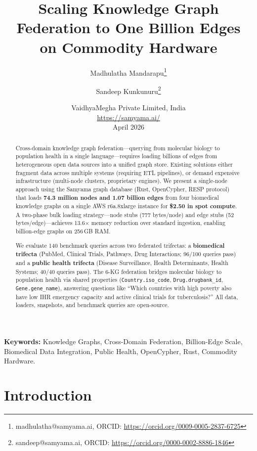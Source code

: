\documentclass[11pt]{article}
\title{Scaling Knowledge Graph Federation to One Billion Edges\\on Commodity Hardware}
\author{
  Madhulatha Mandarapu\thanks{madhulatha@samyama.ai, ORCID: \url{https://orcid.org/0009-0005-2837-6725}} \and
  Sandeep Kunkunuru\thanks{sandeep@samyama.ai, ORCID: \url{https://orcid.org/0000-0002-8886-1846}}
}
\date{%
  VaidhyaMegha Private Limited, India\\[2pt]
  \url{https://samyama.ai/}\\[8pt]
  April 2026
}
\begin{document}
\maketitle

\begin{abstract}
Cross-domain knowledge graph federation---querying from molecular biology to population health in a single language---requires loading billions of edges from heterogeneous open data sources into a unified graph store. Existing solutions either fragment data across multiple systems (requiring ETL pipelines), or demand expensive infrastructure (multi-node clusters, proprietary engines). We present a single-node approach using the Samyama graph database (Rust, OpenCypher, RESP protocol) that loads \textbf{74.3 million nodes and 1.07 billion edges} from four biomedical knowledge graphs on a single AWS r6a.8xlarge instance for \textbf{\$2.50 in spot compute}. A two-phase bulk loading strategy---node stubs (777 bytes/node) and edge stubs (52 bytes/edge)---achieves 13.6$\times$ memory reduction over standard ingestion, enabling billion-edge graphs on 256\,GB RAM.

We evaluate 140 benchmark queries across two federated trifectas: a \textbf{biomedical trifecta} (PubMed, Clinical Trials, Pathways, Drug Interactions; 96/100 queries pass) and a \textbf{public health trifecta} (Disease Surveillance, Health Determinants, Health Systems; 40/40 queries pass). The 6-KG federation bridges molecular biology to population health via shared properties (\texttt{Country.iso\_code}, \texttt{Drug.drugbank\_id}, \texttt{Gene.gene\_name}), answering questions like ``Which countries with high poverty also have low IHR emergency capacity and active clinical trials for tuberculosis?'' All data, loaders, snapshots, and benchmark queries are open-source.
\end{abstract}

\noindent\textbf{Keywords:} Knowledge Graphs, Cross-Domain Federation, Billion-Edge Scale, Biomedical Data Integration, Public Health, OpenCypher, Rust, Commodity Hardware.

\section{Introduction}
\label{sec:intro}
\end{document}
